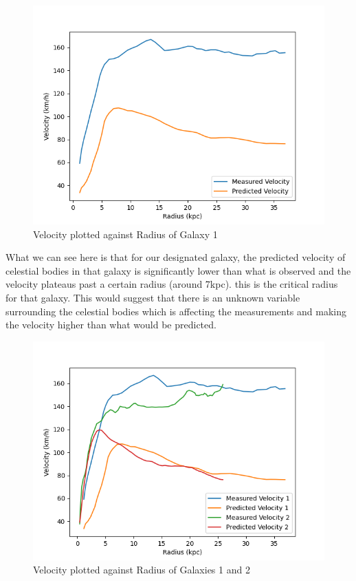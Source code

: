\documentclass[10pt, twocolumn, twoside]{article}
\begin{document}
\newpage

\begin{figure}[ht]
\includegraphics[width=\columnwidth]{graph1.png}
\caption[width=\columnwidth]{Velocity plotted against Radius of Galaxy 1}
\end{figure}

What we can see here is that for our designated galaxy, the predicted velocity of celestial bodies in that galaxy is significantly lower than what is observed and the velocity plateaus past a certain radius (around 7kpc). this is the critical radius for that galaxy. This would suggest that there is an unknown variable surrounding the celestial bodies which is affecting the measurements and making the velocity higher than what would be predicted.

\begin{figure}[ht]
\includegraphics[width=\columnwidth]{graph6.png}
\caption[width=\columnwidth]{Velocity plotted against Radius of Galaxies 1 and 2}
\end{figure}
\end{document}
